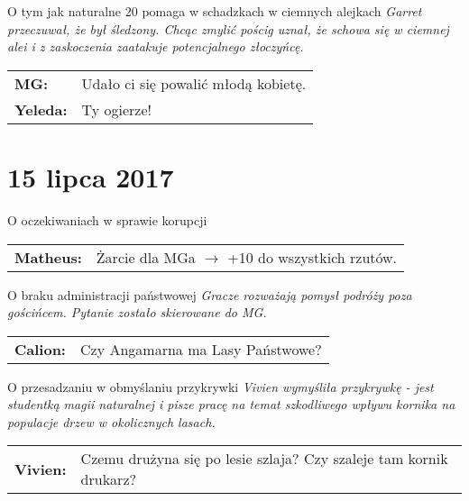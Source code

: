 \documentclass[10pt,twoside,twocolumn]{book}
\begin{document}
\begin{rpg-quotebox}{O tym jak naturalne 20 pomaga w schadzkach w ciemnych alejkach}
   \textit{Garret przeczuwał, że był śledzony. Chcąc zmylić pościg uznał, że schowa się w ciemnej alei i z zaskoczenia zaatakuje potencjalnego złoczyńcę.}\\

   \begin{tabularx}{\columnwidth}{lX}
      \textbf{MG:} & Udało ci się powalić młodą kobietę.\\
      \textbf{Yeleda:} & Ty ogierze!\\
   \end{tabularx}
\end{rpg-quotebox}


\section*{15 lipca 2017}


\begin{rpg-quotebox}{O oczekiwaniach w sprawie korupcji}
   \begin{tabularx}{\columnwidth}{lX}
      \textbf{Matheus:} & Żarcie dla MGa $ \rightarrow $ +10 do wszystkich rzutów.
   \end{tabularx}
\end{rpg-quotebox}


\begin{rpg-quotebox}{O braku administracji państwowej}
   \textit{Gracze rozważają pomysł podróży poza gościńcem. Pytanie zostało skierowane do MG.}\\

   \begin{tabularx}{\columnwidth}{lX}
      \textbf{Calion:} & Czy Angamarna ma Lasy Państwowe?\\
   \end{tabularx}
\end{rpg-quotebox}


\begin{rpg-quotebox}{O przesadzaniu w obmyślaniu przykrywki}
   \textit{Vivien wymyśliła przykrywkę - jest studentką magii naturalnej i pisze pracę na temat szkodliwego wpływu kornika na populacje drzew w okolicznych lasach. }\\

   \begin{tabularx}{\columnwidth}{lX}
      \textbf{Vivien:} & Czemu drużyna się po lesie szlaja? Czy szaleje tam kornik drukarz?\\
   \end{tabularx}
\end{rpg-quotebox}
\end{document}
